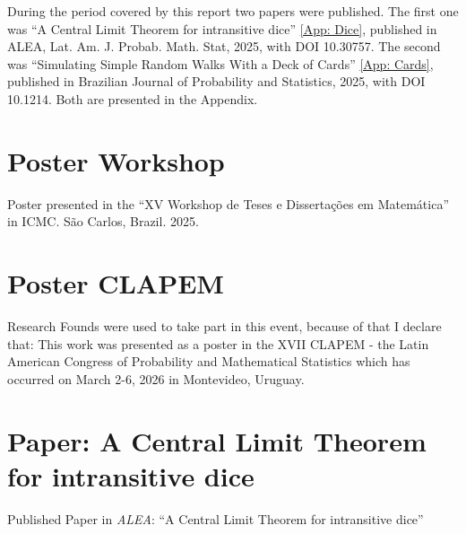 \documentclass[12pt]{report}
\begin{document}
During the period covered by this report two papers were published. The first one was \enquote{A Central Limit Theorem for intransitive dice} \eqref{App: Dice}, published in ALEA, Lat. Am. J. Probab. Math. Stat, 2025, with DOI 10.30757. The second was \enquote{Simulating Simple Random Walks With a Deck of Cards} \eqref{App: Cards}, published in Brazilian Journal of Probability and Statistics, 2025, with DOI 10.1214. Both are presented in the Appendix.






\appendix

\chapter{Poster Workshop}
\label{App: WTD}
Poster presented in the \enquote{XV Workshop de Teses e Dissertações em Matemática} in ICMC. São Carlos, Brazil. 2025.



\chapter{Poster CLAPEM}
\label{App: CLAPEM}

Research Founds were used to take part in this event, because of that I declare that: This work was presented as a poster in the XVII CLAPEM - the Latin American Congress of Probability and Mathematical Statistics which has occurred on March 2-6, 2026 in Montevideo, Uruguay.




\chapter{Paper: A Central Limit Theorem for intransitive dice}
\label{App: Dice}

Published Paper in \textit{ALEA}: \enquote{A Central Limit Theorem for intransitive dice}
\end{document}
